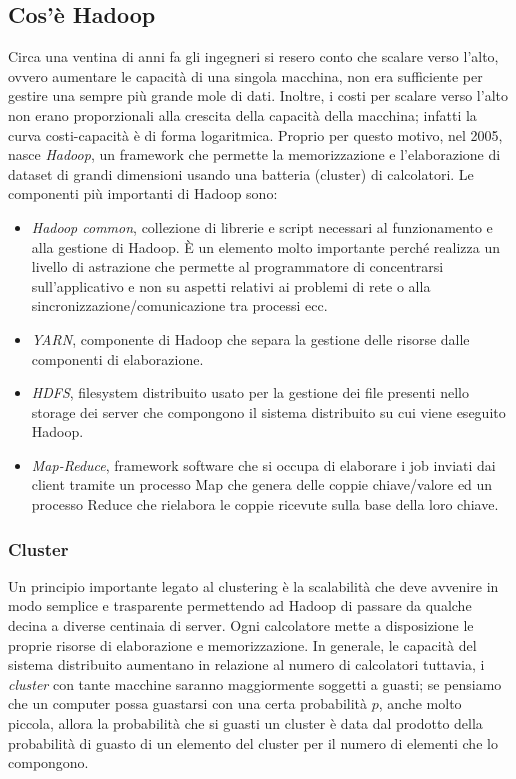 \documentclass[titlepage]{article}
\begin{document}
\subsection{Cos'è Hadoop}
Circa una ventina di anni fa gli ingegneri si resero conto che scalare verso l'alto, ovvero aumentare le capacità di una singola macchina, non era sufficiente per gestire una sempre più grande mole di dati. Inoltre, i costi per scalare verso l'alto non erano proporzionali alla crescita della capacità della macchina; infatti la curva costi-capacità è di forma logaritmica. Proprio per questo motivo, nel 2005, nasce \textit{Hadoop}, un framework che permette la memorizzazione e l'elaborazione di dataset di grandi dimensioni usando una batteria (cluster) di calcolatori. Le componenti più importanti di Hadoop sono:
\begin{itemize}
    \item \textit{Hadoop common}, collezione di librerie e script necessari al funzionamento e alla gestione di Hadoop. È un elemento molto importante perché realizza un livello di astrazione che permette al programmatore di concentrarsi sull'applicativo e non su aspetti relativi ai problemi di rete o alla sincronizzazione/comunicazione tra processi ecc.
    \item \textit{YARN}, componente di Hadoop che separa la gestione delle risorse dalle componenti di elaborazione.
    \item \textit{HDFS}, filesystem distribuito usato per la gestione dei file presenti nello storage dei server che compongono il sistema distribuito su cui viene eseguito Hadoop.
    \item \textit{Map-Reduce}, framework software che si occupa di elaborare i job inviati dai client tramite un processo Map che genera delle coppie chiave/valore ed un processo Reduce che rielabora le coppie ricevute sulla base della loro chiave.
\end{itemize}

\subsubsection{Cluster}
Un principio importante legato al clustering è la scalabilità che deve avvenire in modo semplice e trasparente permettendo ad Hadoop di passare da qualche decina a diverse centinaia di server. Ogni calcolatore mette a disposizione le proprie risorse di elaborazione e memorizzazione. In generale, le capacità del sistema distribuito aumentano in relazione al numero di calcolatori tuttavia, i \textit{cluster} con tante macchine saranno maggiormente soggetti a guasti; se pensiamo che un computer possa guastarsi con una certa probabilità $p$, anche molto piccola, allora la probabilità che si guasti un cluster è data dal prodotto della probabilità di guasto di un elemento del cluster per il numero di elementi che lo compongono.
\end{document}
